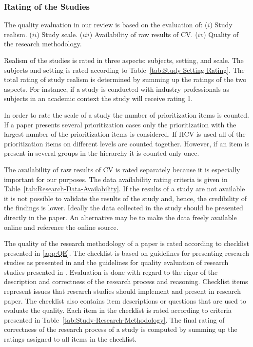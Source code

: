 \subsubsection{Rating of the Studies}

The quality evaluation in our review is based on the evaluation of: ($i$) Study realism. ($ii$) Study scale. ($iii$) Availability of raw results of CV. ($iv$) Quality of the research methodology.

Realism of the studies is rated in three aspects: subjects, setting, and scale.
The subjects and setting is rated according to Table~\ref{tab:Study-Setting-Rating}. The total rating of study realism is determined by summing up the ratings of the two aspects. For instance, if a study is conducted with industry professionals as subjects in an academic context the study will receive rating 1.

In order to rate the scale of a study the number of prioritization items is counted.
If a paper presents several prioritization cases only the prioritization with the largest number of the prioritization items is considered.
If HCV is used all of the prioritization items on different levels are counted together. However, if an item is present in several groups in the hierarchy it is counted only once.

The availability of raw results of CV is rated separately because it is especially important for our purposes. The data availability rating criteria is given in Table~\ref{tab:Research-Data-Availability}. If the results of a study are not available it is not possible to validate the results of the study and, hence, the credibility of the findings is lower. Ideally the data collected in the study should be presented directly in the paper. An alternative may be to make the data freely available online and reference the online source.

The quality of the research methodology of a paper is rated according to checklist presented in \ref{app:QE}. The checklist is based on guidelines for presenting research studies as presented in \citep{Wohlin2000,Jedlitschka2005} and the guidelines for quality evaluation of research studies presented in \citep{Ivarsson2010,Kitchenham2007}. Evaluation is done with regard to the rigor of the description and correctness of the research process and reasoning. Checklist items represent issues that research studies should implement and present in research paper. The checklist also contains item descriptions or questions that are used to evaluate the quality. Each item in the checklist is rated according to criteria presented in Table~\ref{tab:Study-Research-Methodology}. The final rating of correctness of the research process of a study is computed by summing up the ratings assigned to all items in the checklist.

